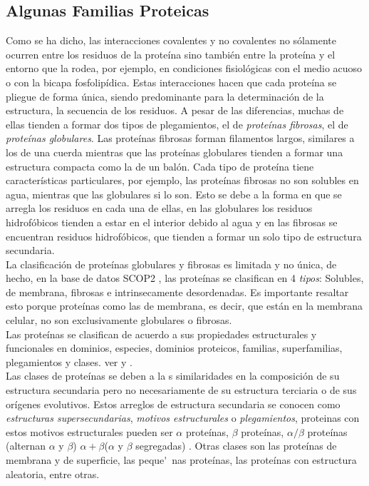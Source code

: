 \subsection{Algunas Familias Proteicas}

Como se ha dicho, las interacciones  covalentes y no covalentes no s\'{o}lamente ocurren entre los residuos de la prote\'{i}na sino 
tambi\'{e}n entre la prote\'{i}na y el entorno que la rodea, por ejemplo, en condiciones fisiol\'{o}gicas con el medio acuoso o con 
la bicapa fosfolip\'{i}dica. Estas interacciones hacen que cada prote\'{i}na se pliegue de forma \'{u}nica, siendo predominante 
para la determinaci\'{o}n de la estructura, la secuencia de los residuos. A 
pesar de las diferencias, muchas de ellas tienden a formar dos tipos de plegamientos, el de \textit{prote\'{i}nas fibrosas}, el de 
\textit{prote\'{i}nas globulares}. Las prote\'{i}nas fibrosas forman filamentos largos, similares a los de una cuerda mientras que las 
prote\'{i}nas globulares tienden a formar una estructura compacta como la de un bal\'{o}n. Cada tipo de prote\'{i}na tiene 
caracter\'{i}sticas particulares, por ejemplo, las prote\'{i}nas fibrosas no son solubles en agua, mientras que las globulares si 
lo son. Esto se debe a la forma en que se arregla los residuos en cada una de ellas, en las globulares los residuos 
hidrof\'{o}bicos tienden a estar en el interior debido al agua y en las fibrosas se encuentran residuos hidrof\'{o}bicos, que tienden a formar un solo tipo de estructura secundaria.\\

La clasificaci\'{o}n de prote\'{i}nas globulares y fibrosas es limitada y no \'{u}nica, de hecho, en la base de datos SCOP2 \cite{Andreeva2014}, las 
prote\'{i}nas se clasifican en 4 \textit{tipos}: Solubles, de membrana, fibrosas e intrinsecamente desordenadas. Es importante resaltar esto porque prote\'{i}nas como las de membrana, es decir, que est\'{a}n en la  membrana celular, no son exclusivamente globulares o fibrosas.\\
Las prote\'{i}nas se clasifican de acuerdo a sus propiedades estructurales y funcionales en dominios, especies, dominios proteicos, familias, superfamilias, plegamientos y clases. ver \cite{Hubbard1999} y \cite{Andreeva2014}.\\

Las clases de prote\'{i}nas se deben a la s similaridades en la composici\'{o}n de su estructura secundaria pero no necesariamente de su estructura terciaria o de sus or\'{i}genes evolutivos. Estos arreglos de estructura secundaria se conocen como \textit{estructuras supersecundarias}, \textit{motivos estructurales} o \textit{plegamientos}, proteinas con estos motivos estructurales pueden ser $\alpha$ prote\'{i}nas, $\beta$ prote\'{i}nas, $\alpha/\beta$ prote\'{i}nas (alternan $\alpha$ y $\beta$) $\alpha+\beta$($\alpha$ y $\beta$ segregadas) . Otras clases son las prote\'{i}nas de membrana y de superficie, las peque\'~{n}as prote\'{i}nas, las prote\'{i}nas con estructura aleatoria, entre otras.\\

